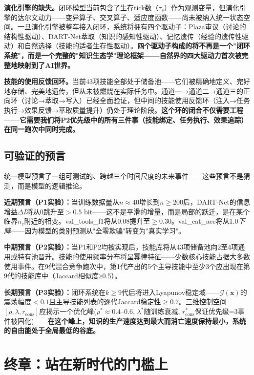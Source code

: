 \documentclass[twocolumn,10.5pt]{ctexart}
\def\cG{\mathcal{G}}
\begin{document}
\textbf{演化引擎的缺失。}闭环模型当前包含了生存tick数（$\tau_s$）作为观测变量，但演化引擎的达尔文动力——变异算子、交叉算子、适应度函数——尚未被纳入统一状态空间。一旦演化引擎被整车接入闭环，系统将拥有四个驱动子：Plaza审议（讨论的结构性驱动）、DART-Net萃取（知识的感知性驱动）、记忆遗传（经验的遗传性驱动）和自然选择（技能的适者生存性驱动）。\textbf{四个驱动子构成的将不再是一个"闭环系统"，而是一个完整的"知识生态学"理论框架——自然界的四大驱动力首次被完整地映射到了AI世界。}

\textbf{技能的使用反馈回环。}当前43项技能全部处于储备池——它们被精确地定义、完好地存储、完美地遗传，但从未被燃烧在实际任务中。通道一→通道二→通道三的正向环（讨论→萃取→写入）已经全面验证，但中间的技能使用反馈环（注入→任务执行→效果反馈→萃取质量提升）仍处于理论阶段。\textbf{这个环的闭合不仅需要工程——它需要我们将P2优先级中的所有三件事（技能绑定、任务执行、效果追踪）在同一跑次中同时完成。}

\subsection{可验证的预言}

统一模型预言了一组可测试的、跨越三个时间尺度的未来事件——这些预言不是猜测，而是模型的逻辑推论。

\textbf{近期预言（P1实验）：}当训练数据量从$n \approx 40$增长到$n \geq 200$后，DART-Net的信息增益$\Delta I$将从0跳升至$>0.5$ bit——这不是平滑的增量，而是局部的跃迁，是在某个临界$n_c$附近的相变。val\_tools\_f1将从0.08提升至$\geq 0.30$。val\_cat\_acc将从1.0\emph{下降}——因为模型的类别预测从"全零欺骗"转变为"真实学习"。

\textbf{中期预言（P2实验）：}当P1和P2均被实现后，技能库将从43项储备池向2至4项通用或特有池晋升。技能的使用频率分布将呈幂律特征——少数核心技能占据大多数使用事件。在9代混合竞争跑次中，第1代产出的5个主导技能中至少3个应出现在第9代的技能库中（Jaccard相似度≥0.5）。

\textbf{长期预言（P3实验）：}闭环系统在$k \geq 9$代后将进入Lyapunov稳定域——$\cG(\mathbf{x})$的震荡幅度$<0.1$且主导技能列表的逐代Jaccard稳定性$\geq 0.7$。三维控制空间$[\rho, \lambda, r_{\text{cons}}]$应揭示一个优化峰($\rho^* \approx 0.4$--0.6, $\lambda^*$随训练衰减, $r_{\text{cons}}^*$保证优先级=3事件被固化)——\textbf{在这个峰上，知识的生产速度达到最大而消亡速度保持最小，系统的自由能处于全局最低的谷底。}

\section{终章：站在新时代的门槛上}
\end{document}
